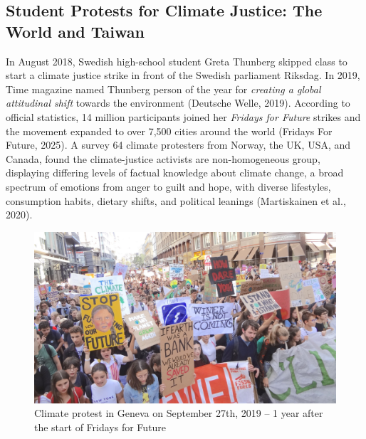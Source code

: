 \documentclass[
  12pt,
  letterpaper,
  DIV=11,
  numbers=noendperiod]{scrartcl}
\begin{document}
\subsection{Student Protests for Climate Justice: The World and
Taiwan}\label{student-protests-for-climate-justice-the-world-and-taiwan}

In August 2018, Swedish high-school student Greta Thunberg skipped class
to start a climate justice strike in front of the Swedish parliament
Riksdag. In 2019, Time magazine named Thunberg person of the year for
\emph{creating a global attitudinal shift} towards the environment
(Deutsche Welle, 2019). According to official statistics, 14 million
participants joined her \emph{Fridays for Future} strikes and the
movement expanded to over 7,500 cities around the world (Fridays For
Future, 2025). A survey 64 climate protesters from Norway, the UK, USA,
and Canada, found the climate-justice activists are non-homogeneous
group, displaying differing levels of factual knowledge about climate
change, a broad spectrum of emotions from anger to guilt and hope, with
diverse lifestyles, consumption habits, dietary shifts, and political
leanings (Martiskainen et al., 2020).

\begin{figure}[H]

{\centering \includegraphics[width=1\linewidth,height=\textheight,keepaspectratio]{./images/college/geneve.jpg}

}

\caption{Climate protest in Geneva on September 27th, 2019 -- 1 year
after the start of Fridays for Future}

\end{figure}%
\end{document}
